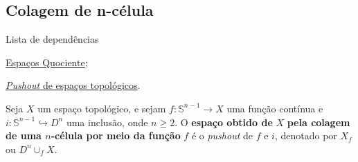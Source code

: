 \subsection{Colagem de n-célula} %
\label{colagem-de-n-celula-def}
\begin{titlemize}{Lista de dependências}
	\item \hyperref[topologia-quociente-def]{Espaços Quociente};\\
    \item \hyperref[pushout-de-espacos-topologicos-def]{\emph{Pushout} de espaços topológicos}.%
\end{titlemize}

\begin{defi}
    Seja $X$ um espaço topológico, e sejam $f:\mathbb{S}^{n-1}\rightarrow X$ uma função contínua e $i:\mathbb{S}^{n-1}\hookrightarrow D^n$ uma inclusão, onde $n\ge 2$. O \textbf{espaço obtido de} $X$ \textbf{pela colagem de uma $n$-célula por meio da função} $f$ é o \emph{pushout} de $f$ e $i$, denotado por $X_f$ ou $D^n\cup_f X$.
\end{defi}

